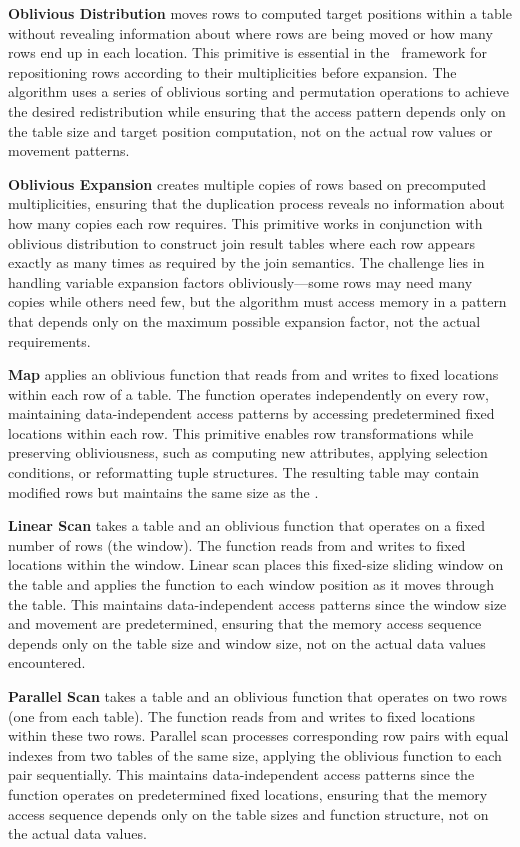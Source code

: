 \textbf{Oblivious Distribution} moves rows to computed target positions within a table without revealing information about where rows are being moved or how many rows end up in each location. This primitive is essential in the \odbj\ framework for repositioning rows according to their multiplicities before expansion. The algorithm uses a series of oblivious sorting and permutation operations to achieve the desired redistribution while ensuring that the access pattern depends only on the table size and target position computation, not on the actual row values or movement patterns.

\textbf{Oblivious Expansion} creates multiple copies of rows based on precomputed multiplicities, ensuring that the duplication process reveals no information about how many copies each row requires. This primitive works in conjunction with oblivious distribution to construct join result tables where each row appears exactly as many times as required by the join semantics. The challenge lies in handling variable expansion factors obliviously---some rows may need many copies while others need few, but the algorithm must access memory in a pattern that depends only on the maximum possible expansion factor, not the actual requirements.

\textbf{Map} applies an oblivious function that reads from and writes to fixed locations within each row of a table. The function operates independently on every row, maintaining data-independent access patterns by accessing predetermined fixed locations within each row. This primitive enables row transformations while preserving obliviousness, such as computing new attributes, applying selection conditions, or reformatting tuple structures. The resulting table may contain modified rows but maintains the same size as the .

\textbf{Linear Scan} takes a table and an oblivious function that operates on a fixed number of rows (the window). The function reads from and writes to fixed locations within the window. Linear scan places this fixed-size sliding window on the table and applies the function to each window position as it moves through the table. This maintains data-independent access patterns since the window size and movement are predetermined, ensuring that the memory access sequence depends only on the table size and window size, not on the actual data values encountered.

\textbf{Parallel Scan} takes a table and an oblivious function that operates on two rows (one from each table). The function reads from and writes to fixed locations within these two rows. Parallel scan processes corresponding row pairs with equal indexes from two tables of the same size, applying the oblivious function to each pair sequentially. This maintains data-independent access patterns since the function operates on predetermined fixed locations, ensuring that the memory access sequence depends only on the table sizes and function structure, not on the actual data values.

